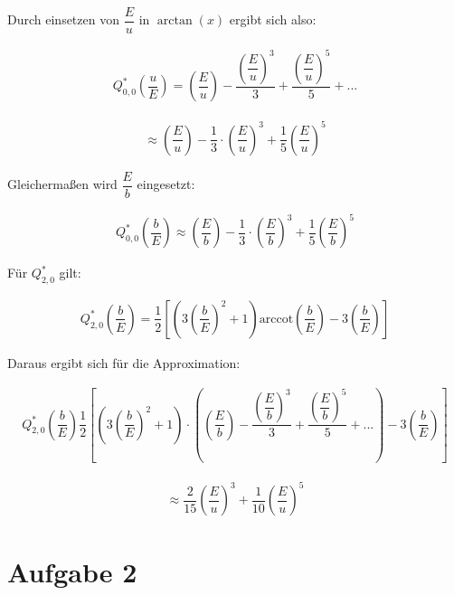 Durch einsetzen von $\dfrac{E}{u}$ in $\arctan(x)$ ergibt sich also: 

\begin{align*}
Q_{0,0}^{*} \left(\dfrac{u}{E}\right) = \left(\dfrac{E}{u}\right)- \dfrac{\left(\dfrac{E}{u}\right)^3}{3}+ \dfrac{\left(\dfrac{E}{u}\right)^5}{5} + ...
\end{align*}

\begin{align*}
\approx \left(\dfrac{E}{u}\right) - \dfrac{1}{3} \cdot \left(\dfrac{E}{u}\right)^3 + \dfrac{1}{5} \left(\dfrac{E}{u}\right)^5 
\end{align*}

Gleichermaßen wird $\dfrac{E}{b}$ eingesetzt:

\begin{align*}
Q_{0,0}^{*} \left(\dfrac{b}{E}\right) \approx \left(\dfrac{E}{b}\right) - \dfrac{1}{3} \cdot \left(\dfrac{E}{b}\right)^3 + \dfrac{1}{5} \left(\dfrac{E}{b}\right)^5
\end{align*}

Für $Q_{2,0}^{*}$ gilt: 

\begin{align*}
Q_{2,0}^{*}\left(\dfrac{b}{E}\right) = \dfrac{1}{2} \left[\left(3 \left(\dfrac{b}{E}\right)^2+1\right) \text{arccot} \left(\dfrac{b}{E}\right)-3 \left(\dfrac{b}{E}\right)\right]
\end{align*}

Daraus ergibt sich für die Approximation: 

\begin{align*}
Q_{2,0}^{*}\left(\dfrac{b}{E}\right) \dfrac{1}{2} \left[\left(3 \left(\dfrac{b}{E}\right)^2+1\right) \cdot \left(\left(\dfrac{E}{b}\right)-\dfrac{\left(\dfrac{E}{b}\right)^3}{3}+\dfrac{\left(\dfrac{E}{b}\right)^5}{5}+...\right)-3 \left(\dfrac{b}{E}\right)\right]
\end{align*}

\begin{align*}
\approx \dfrac{2}{15} \left(\dfrac{E}{u}\right)^3 + \dfrac{1}{10} \left(\dfrac{E}{u}\right)^5
\end{align*}



\section*{Aufgabe 2}

